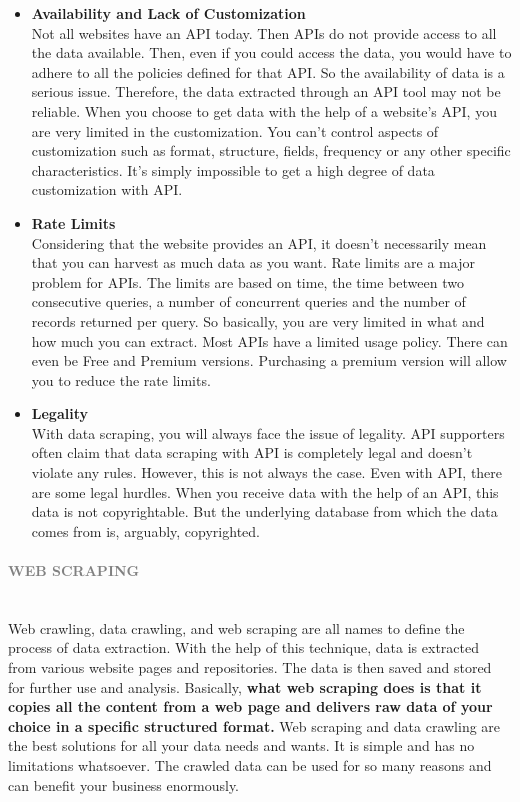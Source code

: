 \documentclass[10pt,a4paper]{article}
\newcommand{\myparagraph}[1]{\paragraph{\normalsize{\textcolor{gray}{\uppercase{\textbf{#1}}}} }\mbox{} \vspace{0.5em}\\}
\begin{document}
\begin{itemize}
	\item \textbf{Availability and Lack of Customization} \\
Not all websites have an API today. Then APIs do not provide access to all the data available. Then, even if you could access the data, you would have to adhere to all the policies defined for that API. So the availability of data is a serious issue. Therefore, the data extracted through an API tool may not be reliable. When you choose to get data with the help of a website’s API, you are very limited in the customization. You can’t control aspects of customization such as format, structure, fields, frequency or any other specific characteristics. It’s simply impossible to get a high degree of data customization with API.
	\item \textbf{Rate Limits} \\
Considering that the website provides an API, it doesn’t necessarily mean that you can harvest as much data as you want. Rate limits are a major problem for APIs. The limits are based on time, the time between two consecutive queries, a number of concurrent queries and the number of records returned per query. So basically, you are very limited in what and how much you can extract. Most APIs have a limited usage policy. There can even be Free and Premium versions. Purchasing a premium version will allow you to reduce the rate limits.
	\item \textbf{Legality} \\
With data scraping, you will always face the issue of legality. API supporters often claim that data scraping with API is completely legal and doesn’t violate any rules. However, this is not always the case. Even with API, there are some legal hurdles. When you receive data with the help of an API, this data is not copyrightable. But the underlying database from which the data comes from is, arguably, copyrighted.
\end{itemize}
\pagebreak
\myparagraph{Web Scraping}
Web crawling, data crawling, and web scraping are all names to define the process of data extraction. With the help of this technique, data is extracted from various website pages and repositories. The data is then saved and stored for further use and analysis. Basically, \textbf{what web scraping does is that it copies all the content from a web page and delivers raw data of your choice in a specific structured format. }
Web scraping and data crawling are the best solutions for all your data needs and wants. It is simple and has no limitations whatsoever. The crawled data can be used for so many reasons and can benefit your business enormously.
\end{document}

